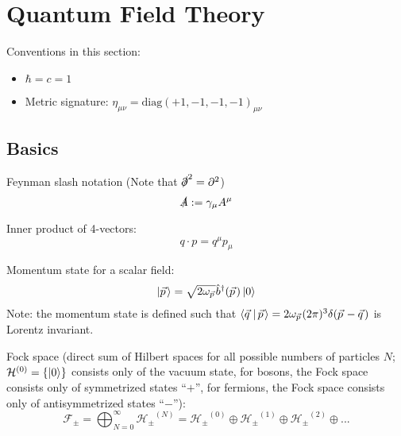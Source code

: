 \section{Quantum Field Theory} %
Conventions in this section:
\begin{itemize}
	\item $\hbar = c = 1$
	\item Metric signature: $\eta_{\mu\nu} = \mathrm{diag}(+1,-1,-1,-1)_{\mu\nu}$
\end{itemize}


\subsection{Basics}
		\noindent
		Feynman slash notation (Note that $\slashed{\partial}^2 = \partial^2$)
		\begin{equation}
			\slashed{A} := \gamma_\mu A^\mu
		\end{equation}

		\noindent
		Inner product of 4-vectors:
		\begin{equation}
			q \cdot p = q^\mu p_\mu
		\end{equation}

		\noindent
		Momentum state for a scalar field:
		\begin{equation}
			\Ket{\vec{p}} = \sqrt{2 \omega_{\vec{p}}} \hat{b}^\dagger(\vec{p}) \Ket{0}
		\end{equation}
		Note: the momentum state is defined such that $\Braket{\vec{q}|\vec{p}} = 2\omega_{\vec{p}} (2\pi)^3 \delta(\vec{p}-\vec{q})$ is Lorentz invariant.

		\noindent
		Fock space (direct sum of Hilbert spaces for all possible numbers of particles $N$; $\mathcal{H}^{(0)} = \qty{\Ket{0}}$ consists only of the vacuum state, for bosons, the Fock space consists only of symmetrized states ``$+$'', for fermions, the Fock space consists only of antisymmetrized states ``$-$''):
		\begin{equation}
			\mathcal{F_\pm}
			= \bigoplus_{N=0}^{\infty} \mathcal{H_\pm}^{(N)}
			= \mathcal{H_\pm}^{(0)} \oplus \mathcal{H_\pm}^{(1)} \oplus \mathcal{H_\pm}^{(2)} \oplus ...
		\end{equation}

